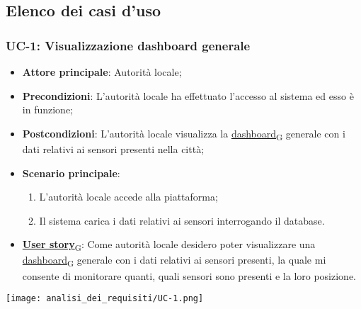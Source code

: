 \subsection{Elenco dei casi d'uso}
\subsubsection{UC-1: Visualizzazione dashboard generale}
\begin{itemize}
	\item \textbf{Attore principale}: Autorità locale;
	\item \textbf{Precondizioni}: L'autorità locale ha effettuato l'accesso al sistema ed esso è in funzione;
	\item \textbf{Postcondizioni}: L'autorità locale visualizza la \href{https://7last.github.io/docs/rtb/documentazione-interna/glossario\#dashboard}{dashboard\textsubscript{G}} generale con i dati relativi ai sensori
	      presenti nella città;
	\item \textbf{Scenario principale}:
	      \begin{enumerate}
		      \item L'autorità locale accede alla piattaforma;
		      \item Il sistema carica i dati relativi ai sensori interrogando il database.
	      \end{enumerate}
	\item \href{https://7last.github.io/docs/rtb/documentazione-interna/glossario\#user-story}{\textbf{User story}\textsubscript{G}}: Come autorità locale desidero poter visualizzare una \href{https://7last.github.io/docs/rtb/documentazione-interna/glossario\#dashboard}{dashboard\textsubscript{G}} generale con i dati relativi ai sensori presenti,
	      la quale mi consente di monitorare quanti, quali sensori sono presenti e la loro posizione.
\end{itemize}
\begin{center}
	\texttt{[image: analisi\_dei\_requisiti/UC-1.png]}
\end{center}

